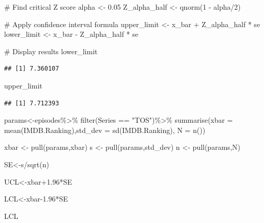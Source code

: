 \documentclass[
]{article}
\newenvironment{Shaded}{\begin{snugshade}}{\end{snugshade}}
\newcommand{\AttributeTok}[1]{\textcolor[rgb]{0.80,0.80,0.80}{#1}}
\newcommand{\CommentTok}[1]{\textcolor[rgb]{0.50,0.62,0.50}{#1}}
\newcommand{\DecValTok}[1]{\textcolor[rgb]{0.86,0.86,0.80}{#1}}
\newcommand{\FloatTok}[1]{\textcolor[rgb]{0.75,0.75,0.82}{#1}}
\newcommand{\FunctionTok}[1]{\textcolor[rgb]{0.94,0.94,0.56}{#1}}
\newcommand{\NormalTok}[1]{\textcolor[rgb]{0.80,0.80,0.80}{#1}}
\newcommand{\OtherTok}[1]{\textcolor[rgb]{0.94,0.94,0.56}{#1}}
\newcommand{\SpecialCharTok}[1]{\textcolor[rgb]{0.86,0.64,0.64}{#1}}
\newcommand{\StringTok}[1]{\textcolor[rgb]{0.80,0.58,0.58}{#1}}
\begin{document}
\begin{Shaded}
\begin{Highlighting}[]
\CommentTok{\# Find critical Z score}
\NormalTok{alpha }\OtherTok{\textless{}{-}} \FloatTok{0.05}
\NormalTok{Z\_alpha\_half }\OtherTok{\textless{}{-}} \FunctionTok{qnorm}\NormalTok{(}\DecValTok{1} \SpecialCharTok{{-}}\NormalTok{ alpha}\SpecialCharTok{/}\DecValTok{2}\NormalTok{)}

\CommentTok{\# Apply confidence interval formula}
\NormalTok{upper\_limit }\OtherTok{\textless{}{-}}\NormalTok{ x\_bar }\SpecialCharTok{+}\NormalTok{ Z\_alpha\_half }\SpecialCharTok{*}\NormalTok{ se}
\NormalTok{lower\_limit }\OtherTok{\textless{}{-}}\NormalTok{ x\_bar }\SpecialCharTok{{-}}\NormalTok{ Z\_alpha\_half }\SpecialCharTok{*}\NormalTok{ se}

\CommentTok{\# Display results}
\NormalTok{lower\_limit}
\end{Highlighting}
\end{Shaded}

\begin{verbatim}
## [1] 7.360107
\end{verbatim}

\begin{Shaded}
\begin{Highlighting}[]
\NormalTok{upper\_limit}
\end{Highlighting}
\end{Shaded}

\begin{verbatim}
## [1] 7.712393
\end{verbatim}

\begin{Shaded}
\begin{Highlighting}[]
\NormalTok{params}\OtherTok{\textless{}{-}}\NormalTok{episodes}\SpecialCharTok{\%\textgreater{}\%}
  \FunctionTok{filter}\NormalTok{(Series }\SpecialCharTok{==} \StringTok{"TOS"}\NormalTok{)}\SpecialCharTok{\%\textgreater{}\%}
  \FunctionTok{summarise}\NormalTok{(}\AttributeTok{xbar =} \FunctionTok{mean}\NormalTok{(IMDB.Ranking),}\AttributeTok{std\_dev =} \FunctionTok{sd}\NormalTok{(IMDB.Ranking), }\AttributeTok{N =} \FunctionTok{n}\NormalTok{())}

\NormalTok{xbar }\OtherTok{\textless{}{-}} \FunctionTok{pull}\NormalTok{(params,xbar)}
\NormalTok{s }\OtherTok{\textless{}{-}} \FunctionTok{pull}\NormalTok{(params,std\_dev)}
\NormalTok{n }\OtherTok{\textless{}{-}} \FunctionTok{pull}\NormalTok{(params,N)}

\NormalTok{SE}\OtherTok{\textless{}{-}}\NormalTok{s}\SpecialCharTok{/}\FunctionTok{sqrt}\NormalTok{(n)}

\NormalTok{UCL}\OtherTok{\textless{}{-}}\NormalTok{xbar}\FloatTok{+1.96}\SpecialCharTok{*}\NormalTok{SE}

\NormalTok{LCL}\OtherTok{\textless{}{-}}\NormalTok{xbar}\FloatTok{{-}1.96}\SpecialCharTok{*}\NormalTok{SE}

\NormalTok{LCL}
\end{Highlighting}
\end{Shaded}
\end{document}
